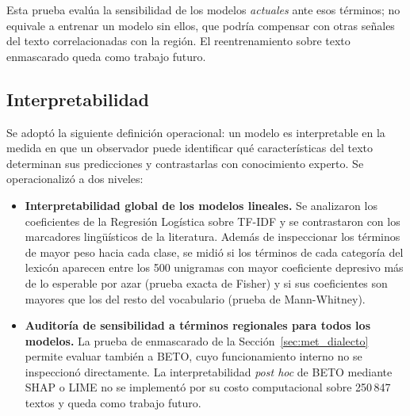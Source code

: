 \documentclass[12pt,a4paper]{article}
\begin{document}
Esta prueba evalúa la sensibilidad de los modelos \emph{actuales} ante esos términos; no equivale a entrenar un modelo sin ellos, que podría compensar con otras señales del texto correlacionadas con la región. El reentrenamiento sobre texto enmascarado queda como trabajo futuro.

\subsection{Interpretabilidad}
\label{sec:interpretabilidad}
Se adoptó la siguiente definición operacional: un modelo es interpretable en la medida en que un observador puede identificar qué características del texto determinan sus predicciones y contrastarlas con conocimiento experto. Se operacionalizó a dos niveles:
\begin{itemize}[leftmargin=2em]
    \item \textbf{Interpretabilidad global de los modelos lineales.} Se analizaron los coeficientes de la Regresión Logística sobre TF-IDF y se contrastaron con los marcadores lingüísticos de la literatura. Además de inspeccionar los términos de mayor peso hacia cada clase, se midió si los términos de cada categoría del lexicón aparecen entre los 500 unigramas con mayor coeficiente depresivo más de lo esperable por azar (prueba exacta de Fisher) y si sus coeficientes son mayores que los del resto del vocabulario (prueba de Mann-Whitney).
    \item \textbf{Auditoría de sensibilidad a términos regionales para todos los modelos.} La prueba de enmascarado de la Sección~\ref{sec:met_dialecto} permite evaluar también a BETO, cuyo funcionamiento interno no se inspeccionó directamente. La interpretabilidad \emph{post hoc} de BETO mediante SHAP o LIME no se implementó por su costo computacional sobre 250\,847 textos y queda como trabajo futuro.
\end{itemize}
\end{document}
